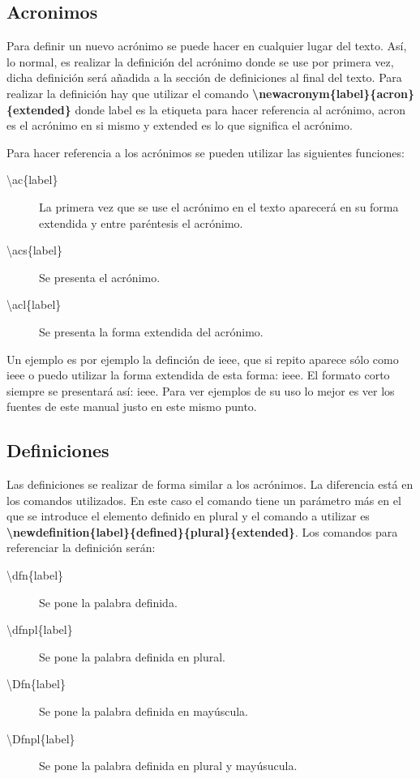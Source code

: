 \subsection{Acronimos}

Para definir un nuevo acrónimo se puede hacer en cualquier lugar del texto. Así, lo normal, es realizar la definición del acrónimo donde se use por primera vez, dicha definición será añadida a la sección de definiciones al final del texto. Para realizar la definición hay que utilizar el comando \textbf{\textbackslash newacronym\{label\}\{acron\}\{extended\}} donde label es la etiqueta para hacer referencia al acrónimo, acron es el acrónimo en si mismo y extended es lo que significa el acrónimo.

Para hacer referencia a los acrónimos se pueden utilizar las siguientes funciones:
\begin{description}
  \item [\textbackslash ac\{label\}] La primera vez que se use el acrónimo en el texto aparecerá en su forma extendida y entre paréntesis el acrónimo.
  \item [\textbackslash acs\{label\}] Se presenta el acrónimo.
  \item [\textbackslash acl\{label\}] Se presenta la forma extendida del acrónimo.
\end{description}


Un ejemplo es por ejemplo la definción de \ac{ieee}, que si repito aparece sólo como \ac{ieee} o puedo utilizar la forma extendida de esta forma: \acl{ieee}. El formato corto siempre se presentará así: \acs{ieee}. Para ver ejemplos de su uso lo mejor es ver los fuentes de este manual justo en este mismo punto.


\subsection{Definiciones}

Las definiciones se realizar de forma similar a los acrónimos. La diferencia está en los comandos utilizados. En este caso el comando tiene un parámetro más en el que se introduce el elemento definido en plural y el comando a utilizar es \textbf{\textbackslash newdefinition\{label\}\{defined\}\{plural\}\{extended\}}.  Los comandos para referenciar la definición serán:
\begin{description}
  \item [\textbackslash dfn\{label\}] Se pone la palabra definida.
  \item [\textbackslash dfnpl\{label\}] Se pone la palabra definida en plural.
  \item [\textbackslash Dfn\{label\}] Se pone la palabra definida en mayúscula.
  \item [\textbackslash Dfnpl\{label\}] Se pone la palabra definida en plural y mayúsucula.
\end{description}

